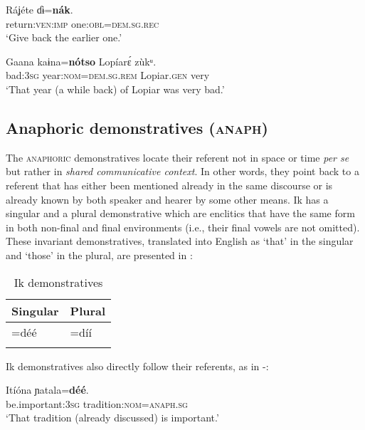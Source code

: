 \ea\label{ex:dem:3}
\gll Ráʝéte     ɗɨ=\textbf{nák\ᵃ}.\\
return:\textsc{ven:imp}   one:\textsc{obl=dem.sg.rec}\\
\glt ‘Give back the earlier one.’ 
\z




\ea\label{ex:dem:4}
\gll Gaana   kaɨna=\textbf{nótso}       Lopíar{\Í}\'{ɛ}     zùkᵘ. \\
bad:\textsc{3sg}   year:\textsc{nom}=\textsc{dem.sg.rem}   Lopiar.\textsc{gen} very    \\
\glt `That year (a while back) of Lopiar was very bad.’
\z  





\subsection{Anaphoric demonstratives (\textsc{anaph})}\label{sec:6.4}

\largerpage[2]
The \textsc{anaphoric} demonstratives locate their referent not in space or time \textit{per se} but rather in \textit{shared communicative context}. In other words, they point back to a referent that has either been mentioned already in the same discourse or is already known by both speaker and hearer by some other means. Ik has a singular and a plural  demonstrative which are enclitics that have the same form in both non-final and final environments (i.e., their final vowels are not omitted). These invariant  demonstratives, translated into English as ‘that’ in the singular and ‘those’ in the plural, are presented in :


\begin{table}
\caption{Ik  demonstratives}
\label{tab:dem:anaph}
\begin{tabularx}{\textwidth}{XX}
\lsptoprule
Singular & Plural\\
\midrule
=déé & =díí\\
\lspbottomrule
\end{tabularx}
\end{table}

Ik  demonstratives also directly follow their referents, as in -:




\ea\label{ex:dem:5}
\gll Itíóna     ɲatala=\textbf{déé}. \\
be.important:\textsc{3sg}   tradition:\textsc{nom}=\textsc{anaph.sg}    \\
\glt ‘That tradition (already discussed) is important.’ 
\z




